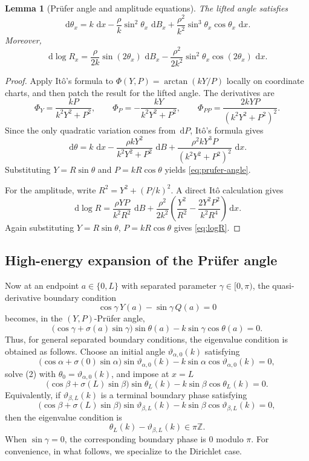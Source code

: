 \documentclass[11pt]{article}
\newtheorem{lemma}[theorem]{Lemma}
\newcommand{\dd}{\,\mathrm d}
\begin{document}
\begin{lemma}[Pr\"ufer angle and amplitude equations]\label{lem:prufer}
The lifted angle satisfies
\begin{equation}\label{eq:prufer-angle}
    \dd\theta_x
    =k\,\dd x-\frac{\rho}{k}\sin^2\theta_x\,\dd B_x
    +\frac{\rho^2}{k^2}\sin^3\theta_x\cos\theta_x\,\dd x.
\end{equation}
Moreover,
\begin{equation}\label{eq:logR}
    \dd\log R_x
    =\frac{\rho}{2k}\sin(2\theta_x)\,\dd B_x
    -\frac{\rho^2}{2k^2}\sin^2\theta_x\cos(2\theta_x)\,\dd x.
\end{equation}
\end{lemma}

\begin{proof}
Apply It\^o's formula to $\Phi(Y,P)=\arctan(kY/P)$ locally on coordinate charts, and then patch the result for the lifted angle. The derivatives are
\[
    \Phi_Y=\frac{kP}{k^2Y^2+P^2},\qquad
    \Phi_P=-\frac{kY}{k^2Y^2+P^2},\qquad
    \Phi_{PP}=\frac{2kYP}{(k^2Y^2+P^2)^2}.
\]
Since the only quadratic variation comes from $\dd P$, It\^o's formula gives
\[
    \dd\theta
    =k\,\dd x-\frac{\rho kY^2}{k^2Y^2+P^2}\,\dd B
    +\frac{\rho^2kY^3P}{(k^2Y^2+P^2)^2}\,\dd x.
\]
Substituting $Y=R\sin\theta$ and $P=kR\cos\theta$ yields \eqref{eq:prufer-angle}.

For the amplitude, write $R^2=Y^2+(P/k)^2$. A direct It\^o calculation gives
\[
    \dd\log R
    =\frac{\rho YP}{k^2R^2}\,\dd B
    +\frac{\rho^2}{2k^2}\left(\frac{Y^2}{R^2}-\frac{2Y^2P^2}{k^2R^4}\right)\dd x.
\]
Again substituting $Y=R\sin\theta$, $P=kR\cos\theta$ gives \eqref{eq:logR}.
\end{proof}

\subsection{High-energy expansion of the Pr\"ufer angle}

Now at an endpoint $a\in\{0,L\}$ with separated parameter $\gamma\in[0,\pi)$, the quasi-derivative boundary condition
\[
    \cos\gamma\,Y(a)-\sin\gamma\,Q(a)=0
\]
becomes, in the $(Y,P)$-Pr\"ufer angle,
\[
    \bigl(\cos\gamma+\sigma(a)\sin\gamma\bigr)\sin\theta(a)
    -k\sin\gamma\cos\theta(a)=0.
\]
Thus, for general separated boundary conditions, the eigenvalue condition is obtained as follows. Choose an initial angle $\vartheta_{\alpha,0}(k)$ satisfying
\[
    \bigl(\cos\alpha+\sigma(0)\sin\alpha\bigr)\sin\vartheta_{\alpha,0}(k)
    -k\sin\alpha\cos\vartheta_{\alpha,0}(k)=0,
\]
solve (2) with $\theta_0=\vartheta_{\alpha,0}(k)$, and impose at $x=L$
\[
    \bigl(\cos\beta+\sigma(L)\sin\beta\bigr)\sin\theta_L(k)
    -k\sin\beta\cos\theta_L(k)=0.
\]
Equivalently, if $\vartheta_{\beta,L}(k)$ is a terminal boundary phase satisfying
\[
    \bigl(\cos\beta+\sigma(L)\sin\beta\bigr)\sin\vartheta_{\beta,L}(k)
    -k\sin\beta\cos\vartheta_{\beta,L}(k)=0,
\]
then the eigenvalue condition is
\[
    \theta_L(k)-\vartheta_{\beta,L}(k)\in\pi\mathbb Z.
\]
When $\sin\gamma=0$, the corresponding boundary phase is $0$ modulo $\pi$. For convenience,  in what follows, we specialize to the Dirichlet case. 
\end{document}

